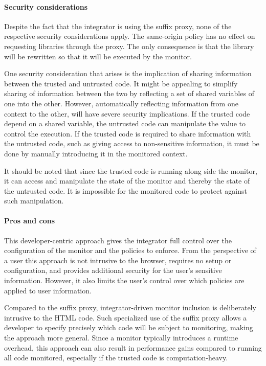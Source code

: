 \documentclass{llncs}
\begin{document}
\vspace{-.4cm}
\paragraph{Security considerations}

Despite the fact that the integrator is using the suffix proxy, none of the 
respective security considerations apply. The same-origin policy has no effect 
on requesting libraries through the proxy. The only consequence is that the library
will be rewritten so that it will be executed by the monitor.

One security consideration that arises is the implication of sharing information between the 
trusted and untrusted code. It might be appealing to simplify sharing of 
information between the two by reflecting a set of shared variables of one into the other.
However, automatically 
reflecting information from one context to the other, will 
have severe security implications. If the trusted code depend on a 
shared variable, the untrusted code can manipulate the value to control the
execution.
If the trusted code is required to share information 
with the untrusted code, such as giving access to non-sensitive information, it 
must be done by manually introducing it in the monitored context.

It should be noted that since the trusted code is running along side the monitor, 
it can access and manipulate the state of the monitor and thereby the state of 
the untrusted code. It is impossible for the monitored code to protect against 
such manipulation.

\vspace{-.4cm}
\paragraph{Pros and cons}

This developer-centric approach gives the integrator full control over the 
configuration of the monitor and the policies to enforce. From the perspective of a user this 
approach is not intrusive to the browser, requires no setup or configuration, 
and provides additional security for the user's sensitive information. However, 
it also limits the user's control over which policies are applied to user information. 

Compared to the suffix proxy, integrator-driven monitor 
inclusion is deliberately intrusive to the HTML code. Such specialized use of the suffix 
proxy allows a developer to specify precisely which code will be subject to 
monitoring, making the approach more general. 
Since a monitor typically introduces a runtime overhead, this approach can also 
result in performance gains compared to running all code monitored, especially 
if the trusted code is computation-heavy.
\end{document}
